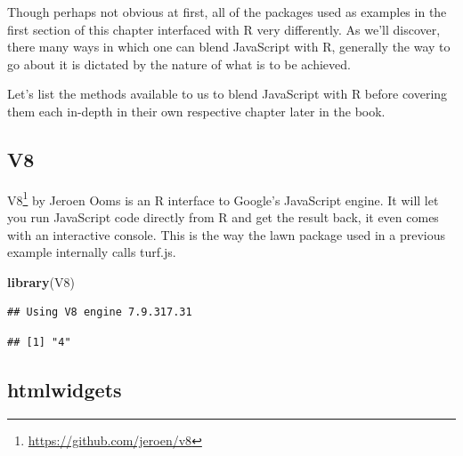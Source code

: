 \documentclass[
]{krantz}
\makeatletter
\newenvironment{Shaded}{\begin{snugshade}}{\end{snugshade}}
\newcommand{\CommentTok}[1]{\textcolor[rgb]{0.37,0.37,0.37}{\textit{#1}}}
\newcommand{\KeywordTok}[1]{\textcolor[rgb]{0.27,0.27,0.27}{\textbf{#1}}}
\newcommand{\NormalTok}[1]{#1}
\newcommand{\OperatorTok}[1]{\textcolor[rgb]{0.43,0.43,0.43}{\textbf{#1}}}
\newcommand{\StringTok}[1]{\textcolor[rgb]{0.5,0.5,0.5}{#1}}
\renewcommand{\href}[2]{#2\footnote{\url{#1}}}
\newenvironment{kframe}{%
\medskip{}
\setlength{\fboxsep}{.8em}
 \def\at@end@of@kframe{}%
 \ifinner\ifhmode%
  \def\at@end@of@kframe{\end{minipage}}%
  \begin{minipage}{\columnwidth}%
 \fi\fi%
 \def\FrameCommand##1{\hskip\@totalleftmargin \hskip-\fboxsep
 \colorbox{shadecolor}{##1}\hskip-\fboxsep
     \hskip-\linewidth \hskip-\@totalleftmargin \hskip\columnwidth}%
 \MakeFramed {\advance\hsize-\width
   \@totalleftmargin\z@ \linewidth\hsize
   \@setminipage}}%
 {\par\unskip\endMakeFramed%
 \at@end@of@kframe}
\renewenvironment{Shaded}{\begin{kframe}}{\end{kframe}}
\makeatother
\begin{document}
Though perhaps not obvious at first, all of the packages used as examples in the first section of this chapter interfaced with R very differently. As we'll discover, there many ways in which one can blend JavaScript with R, generally the way to go about it is dictated by the nature of what is to be achieved.

Let's list the methods available to us to blend JavaScript with R before covering them each in-depth in their own respective chapter later in the book.

\hypertarget{v8}{%
\subsection*{V8}\label{v8}}


\href{https://github.com/jeroen/v8}{V8} by Jeroen Ooms is an R interface to Google's JavaScript engine. It will let you run JavaScript code directly from R and get the result back, it even comes with an interactive console. This is the way the lawn package used in a previous example internally calls turf.js.

\begin{Shaded}
\begin{Highlighting}[]
\KeywordTok{library}\NormalTok{(V8)}
\end{Highlighting}
\end{Shaded}

\begin{verbatim}
## Using V8 engine 7.9.317.31
\end{verbatim}

\begin{Shaded}
\end{Shaded}

\begin{verbatim}
## [1] "4"
\end{verbatim}

\hypertarget{htmlwidgets}{%
\subsection*{htmlwidgets}\label{htmlwidgets}}
\end{document}

